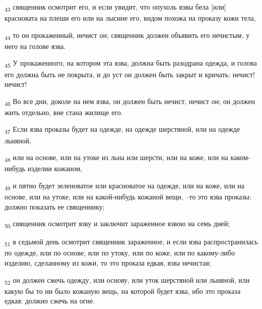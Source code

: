 \begin{tcolorbox}
\textsubscript{43} священник осмотрит его, и если увидит, что опухоль язвы бела [или] красновата на плеши его или на лысине его, видом похожа на проказу кожи тела,
\end{tcolorbox}
\begin{tcolorbox}
\textsubscript{44} то он прокаженный, нечист он; священник должен объявить его нечистым, у него на голове язва.
\end{tcolorbox}
\begin{tcolorbox}
\textsubscript{45} У прокаженного, на котором эта язва, должна быть разодрана одежда, и голова его должна быть не покрыта, и до уст он должен быть закрыт и кричать: нечист! нечист!
\end{tcolorbox}
\begin{tcolorbox}
\textsubscript{46} Во все дни, доколе на нем язва, он должен быть нечист, нечист он; он должен жить отдельно, вне стана жилище его.
\end{tcolorbox}
\begin{tcolorbox}
\textsubscript{47} Если язва проказы будет на одежде, на одежде шерстяной, или на одежде льняной,
\end{tcolorbox}
\begin{tcolorbox}
\textsubscript{48} или на основе, или на утоке из льна или шерсти, или на коже, или на каком-нибудь изделии кожаном,
\end{tcolorbox}
\begin{tcolorbox}
\textsubscript{49} и пятно будет зеленоватое или красноватое на одежде, или на коже, или на основе, или на утоке, или на какой-нибудь кожаной вещи, --то это язва проказы: должно показать ее священнику;
\end{tcolorbox}
\begin{tcolorbox}
\textsubscript{50} священник осмотрит язву и заключит зараженное язвою на семь дней;
\end{tcolorbox}
\begin{tcolorbox}
\textsubscript{51} в седьмой день осмотрит священник зараженное, и если язва распространилась по одежде, или по основе, или по утоку, или по коже, или по какому-либо изделию, сделанному из кожи, то это проказа едкая, язва нечистая;
\end{tcolorbox}
\begin{tcolorbox}
\textsubscript{52} он должен сжечь одежду, или основу, или уток шерстяной или льняной, или какую бы то ни было кожаную вещь, на которой будет язва, ибо это проказа едкая: должно сжечь на огне.
\end{tcolorbox}
